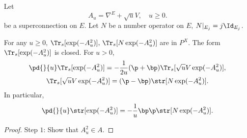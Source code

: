 Let 
\[
A_u=\nabla^E+\sqrt{u}V,\quad u\geq0.
\]
be a superconnection on $E$. Let $N$ be a number operator on $E$, 
$N|_{E_j}=j\Id_{E_j}$. 
\begin{theorem}
    For any $u\geq0$, $\Tr_s[\exp(-A_u^2)],\,\Tr_s[N\exp(-A_u^2)]$
    are in $P^X$. The form $\Tr_s[\exp(-A_u^2)]$ is closed. 
    For $u>0$, 
    \begin{gather*}
    \pd{}{u}\Tr_s[\exp(-A_u^2)] = 
    -\frac{1}{2u}(\p+\bp)\Tr_s[\sqrt{u}V\exp(-A_u^2)], \\
    \Tr_s[\sqrt{u}V\exp(-A_u^2)] = 
    (\p-\bp)\str[N\exp(-A_u^2)].
    \end{gather*}
    In particular, 
    \[
    \pd{}{u}\str[\exp(-A_u^2)] = 
    -\frac{1}{u}\bp\p\str[N\exp(-A_u^2)].
    \]
\end{theorem}
\begin{proof}
    Step $1$: Show that $A_u^2\in A$.
    

\end{proof}
